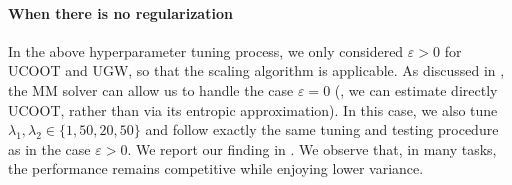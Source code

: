 \paragraph{When there is no regularization} In the above hyperparameter tuning process,
we only considered $\varepsilon > 0$ for UCOOT and UGW, so that the scaling algorithm
\citep{Chizat18b} is applicable. As discussed in ,
the MM solver can allow us to handle the case $\varepsilon = 0$
(\ie, we can estimate directly UCOOT, rather than via its entropic approximation).
In this case, we also tune $\lambda_1, \lambda_2 \in \{ 1, 50, 20, 50\}$ and
follow exactly the same tuning and testing procedure as in the case $\varepsilon > 0$.
We report our finding in . We observe that, in many tasks,
the performance remains competitive while enjoying lower variance.
\newline

